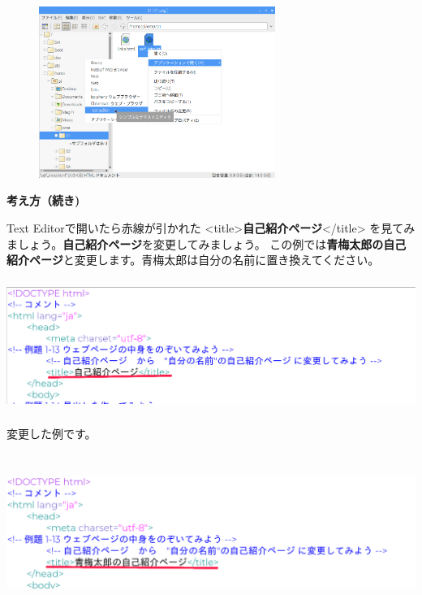 \documentclass[a4paper,12pt]{jarticle}
\begin{document}
\begin{figure}[ht]
\begin{minipage}{\textwidth}
\includegraphics[width=7.701cm,height=5.577cm]{textbook-img145.png}


\bigskip
\end{minipage}


\end{figure}

\clearpage
\textbf{考え方（続き)}

Text Editorで開いたら赤線が引かれた
{\textless}title{\textgreater}\textbf{自己紹介ページ}{\textless}/title{\textgreater}
を見てみましょう。\textbf{自己紹介ページ}を変更してみましょう。
この例では\textbf{青梅太郎の自己紹介ページ}と変更します。青梅太郎は自分の名前に置き換えてください。


\centering
\includegraphics[width=16.316cm,height=4.29cm]{textbook-img146.png}



\bigskip

\flushleft
変更した例です。

\centering
\includegraphics[width=16.198cm,height=5.145cm]{textbook-img148.png}
\end{document}
